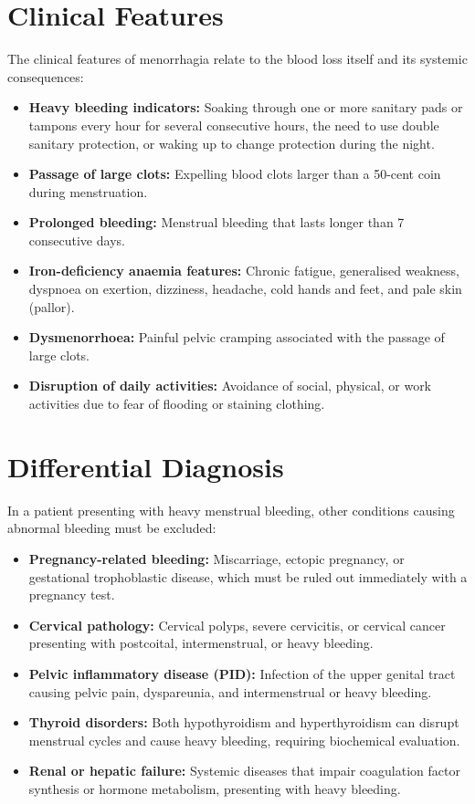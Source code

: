 \section*{Clinical Features}
The clinical features of menorrhagia relate to the blood loss itself and its systemic consequences:
\begin{itemize}
    \item \textbf{Heavy bleeding indicators:} Soaking through one or more sanitary pads or tampons every hour for several consecutive hours, the need to use double sanitary protection, or waking up to change protection during the night.
    \item \textbf{Passage of large clots:} Expelling blood clots larger than a 50-cent coin during menstruation.
    \item \textbf{Prolonged bleeding:} Menstrual bleeding that lasts longer than 7 consecutive days.
    \item \textbf{Iron-deficiency anaemia features:} Chronic fatigue, generalised weakness, dyspnoea on exertion, dizziness, headache, cold hands and feet, and pale skin (pallor).
    \item \textbf{Dysmenorrhoea:} Painful pelvic cramping associated with the passage of large clots.
    \item \textbf{Disruption of daily activities:} Avoidance of social, physical, or work activities due to fear of flooding or staining clothing.
\end{itemize}

\section*{Differential Diagnosis}
In a patient presenting with heavy menstrual bleeding, other conditions causing abnormal bleeding must be excluded:
\begin{itemize}
    \item \textbf{Pregnancy-related bleeding:} Miscarriage, ectopic pregnancy, or gestational trophoblastic disease, which must be ruled out immediately with a pregnancy test.
    \item \textbf{Cervical pathology:} Cervical polyps, severe cervicitis, or cervical cancer presenting with postcoital, intermenstrual, or heavy bleeding.
    \item \textbf{Pelvic inflammatory disease (PID):} Infection of the upper genital tract causing pelvic pain, dyspareunia, and intermenstrual or heavy bleeding.
    \item \textbf{Thyroid disorders:} Both hypothyroidism and hyperthyroidism can disrupt menstrual cycles and cause heavy bleeding, requiring biochemical evaluation.
    \item \textbf{Renal or hepatic failure:} Systemic diseases that impair coagulation factor synthesis or hormone metabolism, presenting with heavy bleeding.
\end{itemize}

